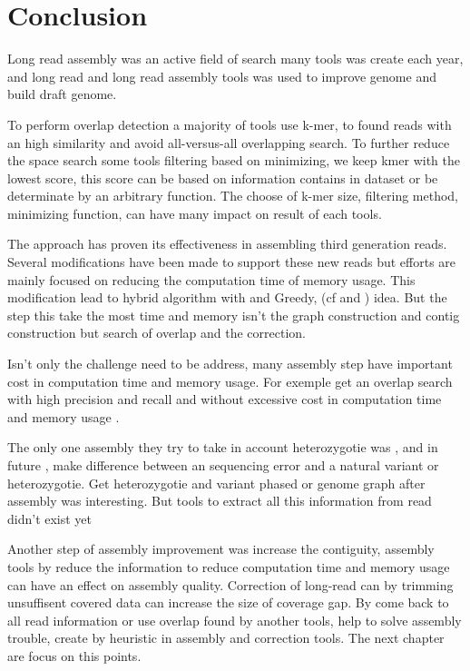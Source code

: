 \documentclass[main]{subfiles}
\begin{document}
\section{Conclusion}

Long read assembly was an active field of search many tools was create each year, and long read and long read assembly tools was used to improve genome and build draft genome.

To perform overlap detection a majority of tools use k-mer, to found reads with an high similarity and avoid all-versus-all overlapping search. To further reduce the space search some tools filtering based on minimizing, we keep kmer with the lowest score, this score can be based on information contains in dataset or be determinate by an arbitrary function. The choose of k-mer size, filtering method, minimizing function, can have many impact on result of each tools. 

The \OLC approach has proven its effectiveness in assembling third generation reads. Several modifications have been made to support these new reads but efforts are mainly focused on reducing the computation time of memory usage. This modification lead to hybrid \OLC algorithm with \DBG and Greedy, (cf \flye and \wtdbg) idea. But the step this take the most time and memory isn't the graph construction and contig construction but search of overlap and the correction.

Isn't only the challenge need to be address, many assembly step have important cost in computation time and memory usage. For exemple get an overlap search with high precision and recall and without excessive cost in computation time and memory usage \cite{bench_ovl}.

The only one assembly they try to take in account heterozygotie was , and in future \shasta, make difference between an sequencing error and a natural variant or heterozygotie. Get heterozygotie and variant phased or genome graph after assembly was interesting. But tools to extract all this information from read didn't exist yet

Another step of assembly improvement was increase the contiguity, assembly tools by reduce the information to reduce computation time and memory usage can have an effect on assembly quality. Correction of long-read can by trimming unsuffisent covered data can increase the size of coverage gap.
By come back to all read information or use overlap found by another tools, help to solve assembly trouble, create by heuristic in assembly and correction tools. The next chapter are focus on this points.


\end{document}
